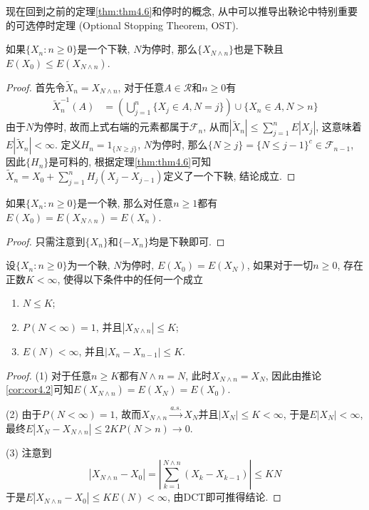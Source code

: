 \documentclass[cn, 12pt, math=mtpro2, bibstyle=apa, blue, twocol]{elegantbook}
\newcommand{\F}{\mathcal{F}}
\begin{document}
现在回到之前的定理\ref{thm:thm4.6}和停时的概念, 从中可以推导出鞅论中特别重要的可选停时定理 (Optional Stopping Theorem, OST).
\begin{theorem}[OST1]
  如果$\{X_n:n\ge0\}$是一个下鞅, $N$为停时, 那么$\{X_{N\wedge n}\}$也是下鞅且$E(X_0)\leq E(X_{N\wedge n})$.
\end{theorem}
\begin{proof}
  首先令$\tilde{X}_n=X_{N\wedge n}$, 对于任意$A\in\mathcal{R}$和$n\ge0$有
  \begin{align*}
  \tilde{X}_n^{-1}(A)&=\left(\bigcup_{j=1}^n \{X_j\in A, N=j\}\right)\cup \{X_n\in A, N>n\}
  \end{align*}
  由于$N$为停时, 故而上式右端的元素都属于$\F_n$, 从而$|\tilde{X}_n|\leq\sum_{j=1}^{n}E|X_j|$, 这意味着$E|\tilde{X}_n|<\infty$. 定义$H_n=1_{\{N\ge j\}}$, $N$为停时, 那么$\{N\ge j\}=\{N\leq j-1\}^c\in\F_{n-1}$, 因此$\{H_n\}$是可料的, 根据定理\ref{thm:thm4.6}可知$\tilde{X}_n=X_0+\sum_{j=1}^{n}H_j(X_j-X_{j-1})$定义了一个下鞅, 结论成立.
\end{proof}
\begin{corollary}\label{cor:cor4.2}
如果$\{X_n:n\ge0\}$是一个鞅, 那么对任意$n\ge1$都有$E(X_0)=E(X_{N\wedge n})=E(X_n)$.
\end{corollary}
\begin{proof}
  只需注意到$\{X_n\}$和$\{-X_n\}$均是下鞅即可.
\end{proof}
\begin{theorem}[OST2]
  设$\{X_n:n\ge0\}$为一个鞅, $N$为停时, $E(X_0)=E(X_N)$, 如果对于一切$n\ge0$, 存在正数$K<\infty$, 使得以下条件中的任何一个成立
  \begin{enumerate}[label=(\arabic*)]
    \item $N\leq K$;
    \item $P(N<\infty)=1$, 并且$|X_{N\wedge n}|\leq K$;
    \item $E(N)<\infty$, 并且$|X_n-X_{n-1}|\leq K$.
  \end{enumerate}
\end{theorem}
\begin{proof}
  (1) 对于任意$n\ge K$都有$N\wedge n=N$, 此时$X_{N\wedge n}=X_N$, 因此由推论\ref{cor:cor4.2}可知$E(X_{N\wedge n})=E(X_N)=E(X_0)$.

  (2) 由于$P(N<\infty)=1$, 故而$X_{N\wedge n}\xrightarrow{a.s.}X_N$并且$|X_N|\leq K<\infty$, 于是$E|X_N|<\infty$, 最终$E|X_N-X_{N\wedge n}|\leq 2KP(N>n)\to0$.

  (3) 注意到
  $$|X_{N\wedge n}-X_0|=\left|\sum_{k=1}^{N\wedge n}(X_k-X_{k-1})\right|\leq KN$$
  于是$E|X_{N\wedge n}-X_0|\leq KE(N)<\infty$, 由DCT即可推得结论.
\end{proof}
\end{document}
